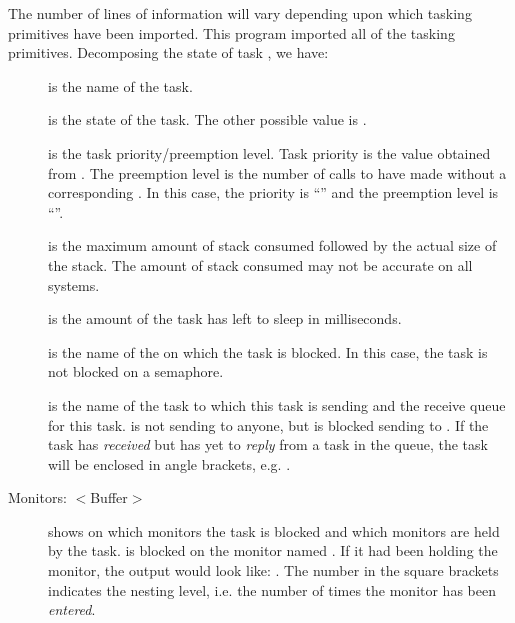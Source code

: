 
The number of lines of information will vary depending upon which
tasking primitives have been imported.  This program imported all
of the tasking primitives.  Decomposing the state of task 
, we have:
\begin{description}
\item[] 
    is the name of the task.
\item[] 
    is the state of the task. The other possible value is .
\item[] 
    is the task priority/preemption level.  Task priority is the
    value obtained from .  The preemption
    level is the number of calls to 
    have made without a corresponding .
    In this case, the priority is ``'' and the preemption level
    is ``''.
\item[] 
    is the maximum amount of stack consumed followed by the actual size of
    the stack.  The amount of stack consumed may not be accurate on all
    systems.
\item[]
    is the amount of the task has left to sleep in milliseconds.
\item[]
    is the name of the  on which
    the task is blocked.  In this case, the task is not blocked on a 
    semaphore.
\item[]
    is the name of the task to which this task is sending and the
    receive queue for this task.   is not sending
    to anyone, but  is blocked sending to .
    If the task has {\em received} but has yet to {\em reply} from a
    task in the queue, the task will be enclosed in angle brackets,
    e.g. .
\item[Monitors: $<$Buffer$>$]
    shows on which monitors the task is blocked and which monitors
    are held by the task.   is blocked on the monitor
    named .  If it had been holding the monitor, the output
    would look like: .  The number in the square brackets
    indicates the nesting level, i.e. the number of times the monitor
    has been {\em entered}.
\end{description}

    



